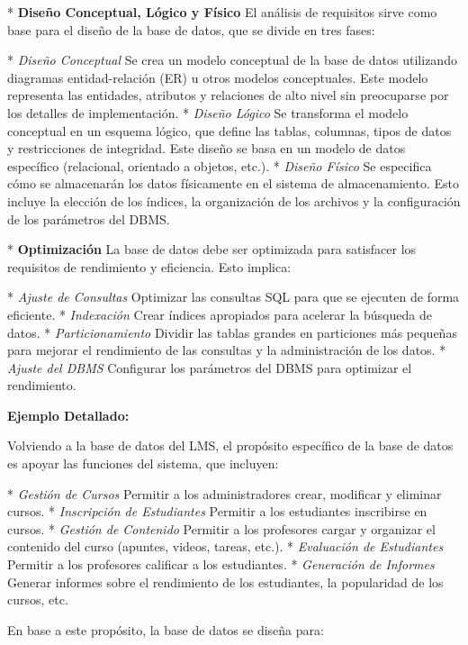 *   \textbf{Diseño Conceptual, Lógico y Físico}  El análisis de requisitos sirve como base para el diseño de la base de datos, que se divide en tres fases:

    *   \textit{Diseño Conceptual} Se crea un modelo conceptual de la base de datos utilizando diagramas entidad-relación (ER) u otros modelos conceptuales.  Este modelo representa las entidades, atributos y relaciones de alto nivel sin preocuparse por los detalles de implementación.
    *   \textit{Diseño Lógico} Se transforma el modelo conceptual en un esquema lógico, que define las tablas, columnas, tipos de datos y restricciones de integridad.  Este diseño se basa en un modelo de datos específico (relacional, orientado a objetos, etc.).
    *   \textit{Diseño Físico} Se especifica cómo se almacenarán los datos físicamente en el sistema de almacenamiento.  Esto incluye la elección de los índices, la organización de los archivos y la configuración de los parámetros del DBMS.

*   \textbf{Optimización} La base de datos debe ser optimizada para satisfacer los requisitos de rendimiento y eficiencia.  Esto implica:

    *   \textit{Ajuste de Consultas}  Optimizar las consultas SQL para que se ejecuten de forma eficiente.
    *   \textit{Indexación}  Crear índices apropiados para acelerar la búsqueda de datos.
    *   \textit{Particionamiento}  Dividir las tablas grandes en particiones más pequeñas para mejorar el rendimiento de las consultas y la administración de los datos.
    *   \textit{Ajuste del DBMS}  Configurar los parámetros del DBMS para optimizar el rendimiento.

\textbf{Ejemplo Detallado:}

Volviendo a la base de datos del LMS, el propósito específico de la base de datos es apoyar las funciones del sistema, que incluyen:

*   \textit{Gestión de Cursos}  Permitir a los administradores crear, modificar y eliminar cursos.
*   \textit{Inscripción de Estudiantes}  Permitir a los estudiantes inscribirse en cursos.
*   \textit{Gestión de Contenido}  Permitir a los profesores cargar y organizar el contenido del curso (apuntes, videos, tareas, etc.).
*   \textit{Evaluación de Estudiantes}  Permitir a los profesores calificar a los estudiantes.
*   \textit{Generación de Informes}  Generar informes sobre el rendimiento de los estudiantes, la popularidad de los cursos, etc.

En base a este propósito, la base de datos se diseña para:

